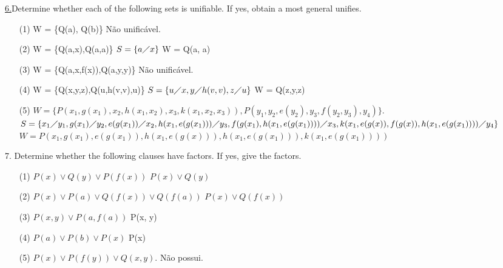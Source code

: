 \underline{6.}Determine whether each of the following sets is unifiable. If yes, obtain a most general unifies.
\begin{itemize}
 \item[(1)] W = \{Q(a), Q(b)\} \newline
Não unificável.
 \item[(2)] W = \{Q(a,x),Q(a,a)\} \newline
$ S = \{ a \diagup x \} $ \newline
W = Q(a, a)
 \item[(3)] W = \{Q(a,x,f(x)),Q(a,y,y)\} \newline
Não unificável.
 \item[(4)] W = \{Q(x,y,z),Q(u,h(v,v),u)\} \newline
$ S = \{u \diagup x, y \diagup h(v,v), z \diagup u \} $ \newline
W = Q(z,y,z)
 \item[(5)] $ W = \{P(x_1,g(x_1),x_2,h(x_1,x_2),x_3,k(x_1,x_2,x_3)), P(y_1,y_2,e(y_2),y_3,f(y_2,y_3),y_4)\} $. \newline
$ S = \{ x_1 \diagup y_1, g(x_1) \diagup y_2, e(g(x_1)) \diagup x_2, h(x_1, e(g(x_1))) \diagup y_3, f(g(x_1), h(x_1,e(g(x_1)))) \diagup x_3,\newline k(x_1, e(g(x)), f(g(x)), h(x_1,e(g(x_1)))) \diagup y_4 \} $\newline
$ W = P(x_1, g(x_1), e(g(x_1)), h(x_1, e(g(x))), h(x_1,e(g(x_1))) , k(x_1,e(g(x_1))))$
\end{itemize}

7. Determine whether the following clauses have factors. If yes, give the factors.
\begin{itemize}
 \item[(1)] $ P(x) \vee Q(y) \vee P(f(x)) $ \newline
$ P(x) \vee Q(y) $
 \item[(2)] $ P(x) \vee P(a) \vee Q(f(x)) \vee Q(f(a)) $ \newline
$ P(x) \vee Q(f(x)) $
 \item[(3)] $ P(x, y) \vee P(a, f(a)) $ \newline
P(x, y)
 \item[(4)] $ P(a) \vee P(b) \vee P(x) $ \newline
P(x)
 \item[(5)] $ P(x) \vee P(f(y)) \vee Q(x,y) $. \newline
Não possui.
\end{itemize}


